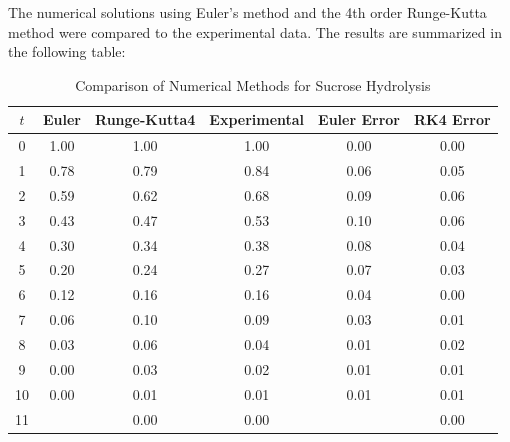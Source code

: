 \documentclass[10pt]{article}
\begin{document}
The numerical solutions using Euler's method and the 4th order Runge-Kutta method were compared to the experimental data. The results are summarized in the following table:
\begin{table}[H]
\centering
\caption{Comparison of Numerical Methods for Sucrose Hydrolysis}
\begin{tabular}{cccccc}
\toprule
\( t \) & Euler & Runge-Kutta4 & Experimental & Euler Error & RK4 Error \\
\midrule
0 & 1.00 & 1.00 & 1.00 & 0.00 & 0.00 \\
1 & 0.78 & 0.79 & 0.84 & 0.06 & 0.05 \\
2 & 0.59 & 0.62 & 0.68 & 0.09 & 0.06 \\
3 & 0.43 & 0.47 & 0.53 & 0.10 & 0.06 \\
4 & 0.30 & 0.34 & 0.38 & 0.08 & 0.04 \\
5 & 0.20 & 0.24 & 0.27 & 0.07 & 0.03 \\
6 & 0.12 & 0.16 & 0.16 & 0.04 & 0.00 \\
7 & 0.06 & 0.10 & 0.09 & 0.03 & 0.01 \\
8 & 0.03 & 0.06 & 0.04 & 0.01 & 0.02 \\
9 & 0.00 & 0.03 & 0.02 & 0.01 & 0.01 \\
10 & 0.00 & 0.01 & 0.01 & 0.01 & 0.01 \\
11 &  & 0.00 & 0.00 &  & 0.00 \\
\bottomrule
\end{tabular}
\end{table}
\end{document}
